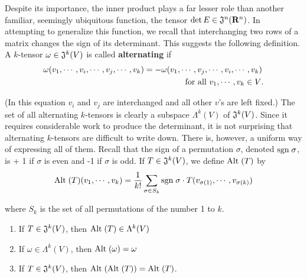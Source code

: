 Despite its importance, the inner product plays a far lesser
role than another familiar, seemingly ubiquitous function,
the tensor $\det E\in \mathfrak{J}^n(\mathbf{R}^n)$. In attempting to generalize this
function, we recall that interchanging two rows of a matrix
changes the sign of its determinant. This suggests the following definition.
A $k$-tensor $\omega\in \mathfrak{J}^k(V)$ is called \textbf{alternating} if
\begin{align*}
    \omega(v_1, \cdots, v_i, \cdots, v_j, \cdots, v_k) 
    & = -\omega(v_1, \cdots, v_j, \cdots, v_i, \cdots, v_k)\\
    &\hspace*{5em} \text{for all $v_1, \cdots, v_k\in V$.}
\end{align*}

(In this equation $v_i$ and $v_j$ are interchanged and all other $v$'s
are left fixed.) The set of all alternating $k$-tensors is clearly
a subspace $\Lambda^k(V)$ of $\mathfrak{J}^k(V)$. Since it requires considerable
work to produce the determinant, it is not surprising that
alternating $k$-tensors are difficult to write down.
There is, however, a uniform way of expressing all of them. Recall
that the sign of a permutation $\sigma$, denoted $\mathrm{sgn}\;\sigma$, 
is + 1 if $\sigma$ is even and -1 if $\sigma$ is odd. If 
$T \in \mathfrak{J}^k(V)$, we define $\mathrm{Alt}\;(T)$ by
\begin{align*}
    \mathrm{Alt}\;(T)(v_1, \cdots, v_k) = \frac{1}{k!}\sum_{\sigma\in S_k}^{}{\mathrm{sgn}\;\sigma\cdot T(v_{\sigma(1)}, \cdots, v_{\sigma(k)})}
\end{align*}

where $S_k$ is the set of all permutations of the number 1 to $k$.

\begin{theorem}
    \begin{enumerate}[label=\upshape{(\arabic*)}]
        \item If $T\in \mathfrak{J}^k(V)$, then $\mathrm{Alt}\;(T)\in \Lambda^k(V)$
        \item If $\omega \in \Lambda^k(V)$, then $\mathrm{Alt}\;(\omega)=\omega$
        \item If $T\in \mathfrak{J}^k(V)$, then $\mathrm{Alt}\;(\mathrm{Alt}\;(T)) = \mathrm{Alt}\;(T)$.
    \end{enumerate}
\end{theorem}

